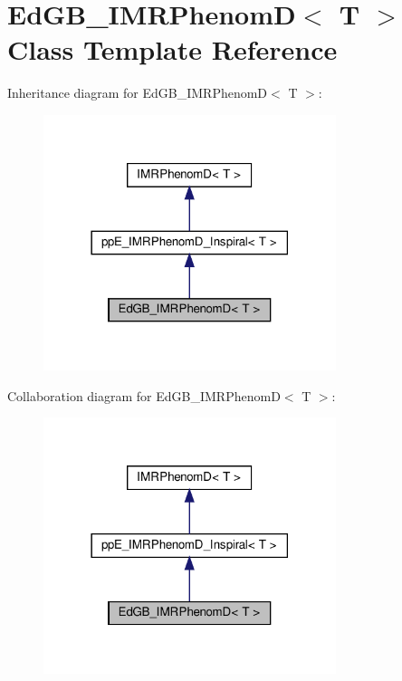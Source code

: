 \hypertarget{classEdGB__IMRPhenomD}{}\section{Ed\+G\+B\+\_\+\+I\+M\+R\+PhenomD$<$ T $>$ Class Template Reference}
\label{classEdGB__IMRPhenomD}


Inheritance diagram for Ed\+G\+B\+\_\+\+I\+M\+R\+PhenomD$<$ T $>$\+:\nopagebreak
\begin{figure}[H]
\begin{center}
\leavevmode
\includegraphics[width=242pt]{classEdGB__IMRPhenomD__inherit__graph}
\end{center}
\end{figure}


Collaboration diagram for Ed\+G\+B\+\_\+\+I\+M\+R\+PhenomD$<$ T $>$\+:\nopagebreak
\begin{figure}[H]
\begin{center}
\leavevmode
\includegraphics[width=242pt]{classEdGB__IMRPhenomD__coll__graph}
\end{center}
\end{figure}
